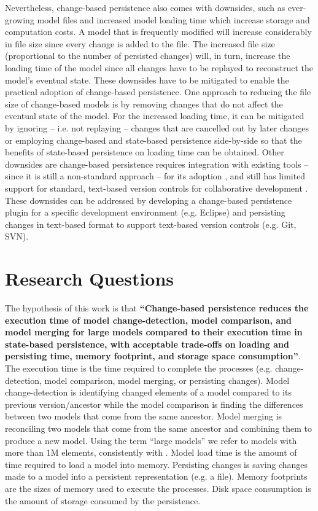 \documentclass[12pt, a4paper]{report} \usepackage[titletoc]{appendix}
\begin{document}
Nevertheless, change-based persistence also comes with downsides, such as ever-growing model files \cite{DBLP:journals/entcs/RobbesL07,DBLP:conf/edoc/KoegelHLHD10} and increased model loading time \cite{mens2002state} which increase storage and computation costs. A model that is frequently modified will increase considerably in file size since every change is added to the file. The increased file size (proportional to the number of persisted changes) will, in turn, increase the loading time of the model since all changes have to be replayed to reconstruct the model's eventual state. These downsides have to be mitigated to enable the practical adoption of change-based persistence. One approach to reducing the file size of change-based models is by removing changes that do not affect the eventual state of the model. For the increased loading time, it can be mitigated by ignoring -- i.e. not replaying -- changes that are cancelled out by later changes or employing change-based and state-based persistence side-by-side so that the benefits of state-based persistence on loading time can be obtained. Other downsides are change-based persistence requires integration with existing tools -- since it is still a non-standard approach -- for its adoption \cite{koegel2010emfstore}, and still has limited support for standard, text-based version controls for collaborative development \cite{koegel2010emfstore}. These downsides can be addressed by developing a change-based persistence plugin for a specific development environment (e.g. Eclipse) and persisting changes in text-based format to support text-based version controls (e.g. Git, SVN).

\section{Research Questions}
\label{sec:research_questions}
The hypothesis of this work is that \textbf{``Change-based persistence reduces the execution time of model change-detection, model comparison, and model merging for large models compared to their execution time in state-based persistence, with acceptable trade-offs on loading and persisting time, memory footprint, and storage space consumption''}. The execution time is the time required to complete the processes (e.g. change-detection, model comparison, model merging, or persisting changes). Model change-detection is identifying changed elements of a model compared to its previous version/ancestor while the model comparison is finding the differences between two models that come from the same ancestor. Model merging is reconciling two models that come from the same ancestor and combining them to produce a new model. Using the term ``large models'' we refer to models with more than 1M elements, consistently with \cite{daniel2016neoemf,DBLP:conf/models/Espinazo-PaganCM11}. Model load time is the amount of time required to load a model into memory. Persisting changes is saving changes made to a model into a persistent representation (e.g. a file). Memory footprints are the sizes of memory used to execute the processes. Disk space consumption is the amount of storage consumed by the persistence.
\end{document}
